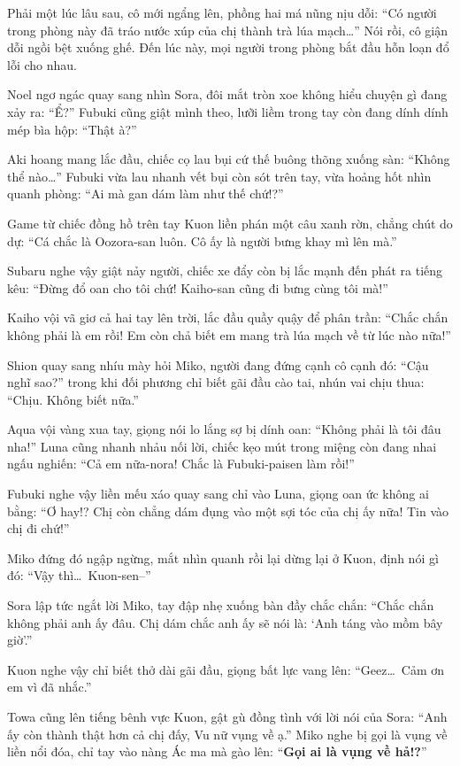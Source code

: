 \documentclass[../main.tex]{subfiles}
\begin{document}
Phải một lúc lâu sau, cô mới ngẩng lên, phồng hai má nũng nịu dỗi: ``Có người trong phòng này đã tráo nước xúp của chị thành trà lúa mạch\dots'' Nói rồi, cô giận dỗi ngồi bệt xuống ghế.
Đến lúc này, mọi người trong phòng bắt đầu hỗn loạn đổ lỗi cho nhau.

Noel ngơ ngác quay sang nhìn Sora, đôi mắt tròn xoe không hiểu chuyện gì đang xảy ra: ``Ể?''
Fubuki cũng giật mình theo, lưỡi liềm trong tay còn đang dính dính mép bìa hộp: ``Thật à?''

Aki hoang mang lắc đầu, chiếc cọ lau bụi cứ thế buông thõng xuống sàn: ``Không thể nào\dots''
Fubuki vừa lau nhanh vết bụi còn sót trên tay, vừa hoảng hốt nhìn quanh phòng: ``Ai mà gan dám làm như thế chứ!?''

Game từ chiếc đồng hồ trên tay Kuon liền phán một câu xanh rờn, chẳng chút do dự: ``Cá chắc là Oozora-san luôn. Cô ấy là người bưng khay mì lên mà.''

Subaru nghe vậy giật nảy người, chiếc xe đẩy còn bị lắc mạnh đến phát ra tiếng kêu: ``Đừng đổ oan cho tôi chứ! Kaiho-san cũng đi bưng cùng tôi mà!''

Kaiho vội vã giơ cả hai tay lên trời, lắc đầu quầy quậy để phân trần: ``Chắc chắn không phải là em rồi! Em còn chả biết em mang trà lúa mạch về từ lúc nào nữa!''

Shion quay sang nhíu mày hỏi Miko, người đang đứng cạnh cô cạnh đó: ``Cậu nghĩ sao?'' trong khi đối phương chỉ biết gãi đầu cào tai, nhún vai chịu thua: ``Chịu. Không biết nữa.''

Aqua vội vàng xua tay, giọng nói lo lắng sợ bị dính oan: ``Không phải là tôi đâu nha!'' Luna cũng nhanh nhảu nối lời, chiếc kẹo mút trong miệng còn đang nhai ngấu nghiến: ``Cả em nữa-nora! Chắc là Fubuki-paisen làm rồi!''

Fubuki nghe vậy liền mếu xáo quay sang chỉ vào Luna, giọng oan ức không ai bằng: ``Ơ hay!? Chị còn chẳng dám đụng vào một sợi tóc của chị ấy nữa! Tin vào chị đi chứ!''

Miko đứng đó ngập ngừng, mắt nhìn quanh rồi lại dừng lại ở Kuon, định nói gì đó: ``Vậy thì\dots\ Kuon-sen--''

Sora lập tức ngắt lời Miko, tay đập nhẹ xuống bàn đầy chắc chắn: ``Chắc chắn không phải anh ấy đâu. Chị dám chắc anh ấy sẽ nói là: `Anh táng vào mồm bây giờ'.''

Kuon nghe vậy chỉ biết thở dài gãi đầu, giọng bất lực vang lên: ``Geez\dots\ Cảm ơn em vì đã nhắc.''

Towa cũng lên tiếng bênh vực Kuon, gật gù đồng tình với lời nói của Sora: ``Anh ấy còn thành thật hơn cả chị đấy, Vu nữ vụng về ạ.'' Miko nghe bị gọi là vụng về liền nổi đóa, chỉ tay vào nàng Ác ma mà gào lên: ``\textbf{Gọi ai là vụng về hả!?}''
\end{document}
